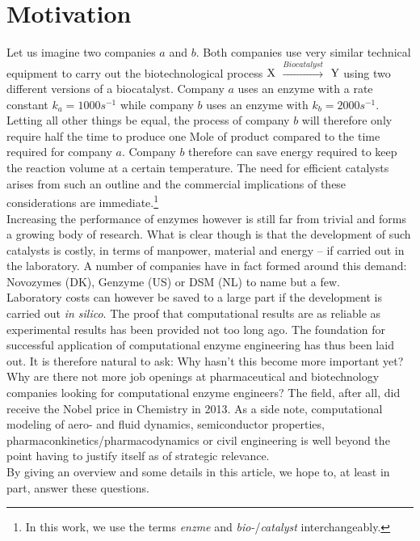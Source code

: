 \section{Motivation}\label{sec:mot}
Let us imagine two companies $a$ and $b$.
Both companies use very similar technical equipment to carry out the biotechnological process $\ce{X}$ $\xrightarrow{Biocatalyst}$ $\ce{Y}$ using two different versions of a biocatalyst.
Company $a$ uses an enzyme with a rate constant $k_{a} = 1000s^{-1}$ while company $b$ uses an enzyme with $k_{b} = 2000s^{-1}$.
Letting all other things be equal, the process of company $b$ will therefore only require half the time to produce one Mole of product compared to the time required for company $a$.
Company $b$ therefore can save energy required to keep the reaction volume at a certain temperature.
The need for efficient catalysts arises from such an outline and the commercial implications of these considerations are immediate.\footnote{In this work, we use the terms \textit{enzme} and \textit{bio-}/\textit{catalyst} interchangeably.}\\
Increasing the performance of enzymes however is still far from trivial and forms a growing body of research.
What is clear though is that the development of such catalysts is costly, in terms of manpower, material and energy -- if carried out in the laboratory.
A number of companies have in fact formed around this demand: Novozymes (DK), Genzyme (US) or DSM (NL) to name but a few\cite{meyer2013use, kirk2002industrial, beilen2002enzyme, schmid2002use}.\\
Laboratory costs can however be saved to a large part if the development is carried out \textit{in silico}.
The proof that computational results are as reliable as experimental results has been provided not too long ago\cite{claeyssens2006high}.
The foundation for successful application of computational enzyme engineering has thus been laid out.
It is therefore natural to ask: Why hasn't this become more important yet?
Why are there not more job openings at pharmaceutical and biotechnology companies looking for computational enzyme engineers?
The field, after all, did receive the Nobel price in Chemistry in 2013.
As a side note, computational modeling of aero- and fluid dynamics, semiconductor properties, pharmaconkinetics/pharmacodynamics or civil engineering is well beyond the point having to justify itself as of strategic relevance.\\
By giving an overview and some details in this article, we hope to, at least in part, answer these questions.


